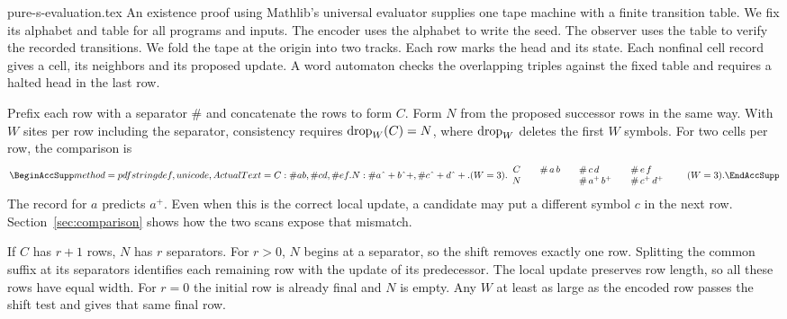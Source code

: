\begin{filecontents*}[overwrite]{pure-s-evaluation.tex}
\label{sec:history}
An existence proof using Mathlib's universal evaluator supplies one tape machine with a finite transition table. We fix its alphabet and table for all programs and inputs. The encoder uses the alphabet to write the seed. The observer uses the table to verify the recorded transitions. We fold the tape at the origin into two tracks. Each row marks the head and its state. Each nonfinal cell record gives a cell, its neighbors and its proposed update. A word automaton checks the overlapping triples against the fixed table and requires a halted head in the last row.

Prefix each row with a separator $\#$ and concatenate the rows to form $C$. Form $N$ from the proposed successor rows in the same way. With $W$ sites per row including the separator, consistency requires $\dropop_W(C)=N$, where $\dropop_W$ deletes the first $W$ symbols. For two cells per row, the comparison is
\[
\mathcopy{C: \# a b, \# c d, \# e f. N: \# a\string^+ b\string^+, \# c\string^+ d\string^+. (W = 3).}{%
\begin{array}{c@{\qquad}l@{\qquad}l@{\qquad}l}
 C & \#\,a\,b & \#\,c\,d & \#\,e\,f \\
 N &            & \#\,a^+\,b^+ & \#\,c^+\,d^+
\end{array}\qquad (W=3).}
\]
The record for $a$ predicts $a^+$. Even when this is the correct local update, a candidate may put a different symbol $c$ in the next row. Section~\ref{sec:comparison} shows how the two scans expose that mismatch.

If $C$ has $r+1$ rows, $N$ has $r$ separators. For $r>0$, $N$ begins at a separator, so the shift removes exactly one row. Splitting the common suffix at its separators identifies each remaining row with the update of its predecessor. The local update preserves row length, so all these rows have equal width. For $r=0$ the initial row is already final and $N$ is empty. Any $W$ at least as large as the encoded row passes the shift test and gives that same final row.
\end{filecontents*}
